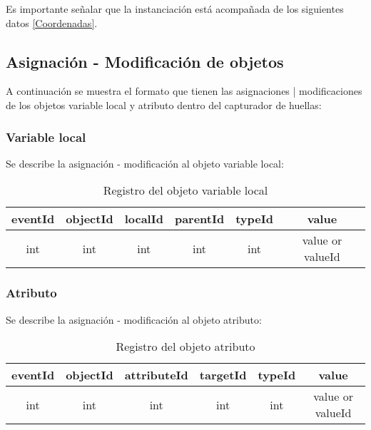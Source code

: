 \documentclass[10pt,a4paper]{article}
\begin{document}
Es importante señalar que la instanciación está acompañada de los siguientes datos \ref{Coordenadas}.


\subsection{Asignación - Modificación de objetos}
A continuación se muestra el formato que tienen las asignaciones | modificaciones de los objetos variable local y atributo dentro del capturador de huellas:\\

\subsubsection{Variable local}

Se describe la asignación - modificación al objeto variable local:\\

\begin{table}[!h]
\begin{center}
\begin{tabular}{| c | c | c | c | c | c |}
\hline
eventId & objectId & localId & parentId & typeId & value\\
\hline
int & int & int & int & int & value or valueId\footnotemark[1]\\
\hline
\end{tabular}
\caption{Registro del objeto variable local} 
\end{center}
\end{table}

\subsubsection{Atributo}

Se describe la asignación - modificación al objeto atributo:\\

\begin{table}[!h]
\begin{center}
\begin{tabular}{| c | c | c | c | c | c |}
\hline
eventId & objectId & attributeId & targetId & typeId & value\\
\hline
int & int & int & int & int & value or valueId\footnotemark[1]\\
\hline
\end{tabular}
\caption{Registro del objeto atributo} 
\end{center}
\end{table}
\end{document}

